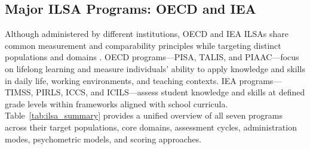 \documentclass{ieeeaccess}
\begin{document}
\subsection{Major ILSA Programs: OECD and IEA}\label{subsec2.2}

Although administered by different institutions, OECD and IEA ILSAs share common measurement and comparability principles while targeting distinct populations and domains \cite{hernandez-torrano-courtney2021, lee-lee-ExtendedDataset2025}. OECD programs---PISA, TALIS, and PIAAC---focus on lifelong learning and measure individuals’ ability to apply knowledge and skills in daily life, working environments, and teaching contexts. IEA programs---TIMSS, PIRLS, ICCS, and ICILS---assess student knowledge and skills at defined grade levels within frameworks aligned with school curricula. Table~\ref{tab:ilsa_summary} provides a unified overview of all seven programs across their target populations, core domains, assessment cycles, administration modes, psychometric models, and scoring approaches.
\end{document}
